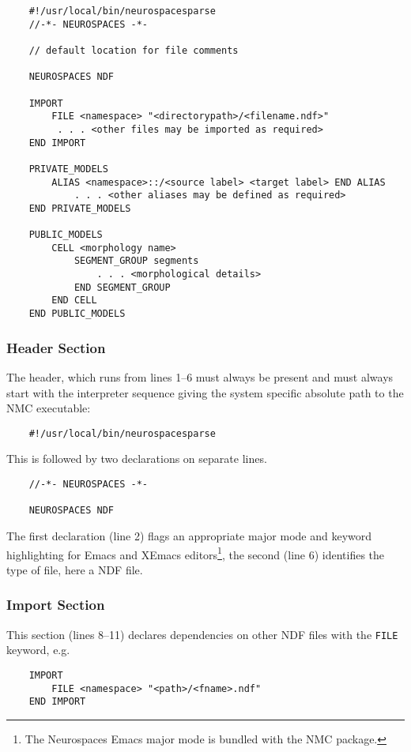 \documentclass[12pt]{article}
\begin{document}
\begin{center}
 \begin{linenumbers}
\begin{verbatim}
    #!/usr/local/bin/neurospacesparse
    //-*- NEUROSPACES -*-

    // default location for file comments

    NEUROSPACES NDF

    IMPORT
        FILE <namespace> "<directorypath>/<filename.ndf>"
         . . . <other files may be imported as required>
    END IMPORT

    PRIVATE_MODELS
        ALIAS <namespace>::/<source label> <target label> END ALIAS
            . . . <other aliases may be defined as required>
    END PRIVATE_MODELS

    PUBLIC_MODELS
        CELL <morphology name>
            SEGMENT_GROUP segments
                . . . <morphological details>
            END SEGMENT_GROUP
        END CELL
    END PUBLIC_MODELS
\end{verbatim}
\end{linenumbers}
\end{center}

\subsubsection*{Header Section}
The header, which runs from lines 1--6 must always be present and must always start with the
interpreter sequence giving the system specific absolute path to the
NMC executable:
\begin{verbatim}
    #!/usr/local/bin/neurospacesparse
\end{verbatim}
This is followed by two declarations on separate lines. 
\begin{verbatim}
    //-*- NEUROSPACES -*-
    
    NEUROSPACES NDF
    \end{verbatim}
The first declaration (line 2) flags an appropriate major mode and keyword highlighting for Emacs and
XEmacs editors\footnote{The Neurospaces Emacs major mode is bundled
  with the NMC package.}, the second (line 6) identifies the type
of file, here a NDF file.

\subsubsection*{Import Section}
This section (lines 8--11) declares dependencies on other NDF files with the {\tt  FILE} keyword, e.g.
\begin{verbatim}
    IMPORT
        FILE <namespace> "<path>/<fname>.ndf"
    END IMPORT
\end{verbatim}
\end{document}
